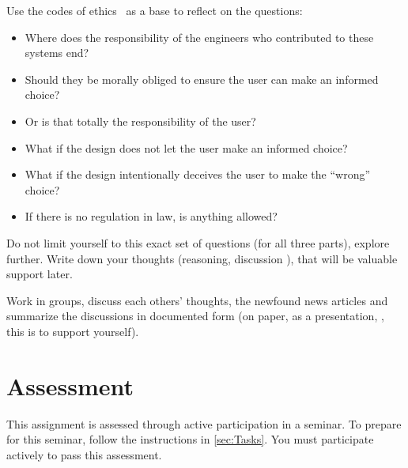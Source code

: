\begin{frame}
Use the codes of ethics~\cite{acmcode,acmsecode,ieeecode} as a base to reflect 
on the questions:
\begin{itemize}
  \item Where does the responsibility of the engineers who contributed to these 
    systems end?
  \item Should they be morally obliged to ensure the user can make an informed 
    choice?
  \item Or is that totally the responsibility of the user?
  \item What if the design does not let the user make an informed choice?
  \item What if the design intentionally deceives the user to make the 
    \enquote{wrong} choice?
  \item If there is no regulation in law, is anything allowed?
\end{itemize}
\end{frame}

Do not limit yourself to this exact set of questions (for all three parts), 
explore further.
Write down your thoughts (reasoning, discussion \etc), that will be valuable 
support later.

Work in groups, discuss each others' thoughts, the newfound news articles and 
summarize the discussions in documented form (on paper, as a presentation, 
\etc, this is to support yourself).


\section{Assessment}%
\label{Assessment}

This assignment is assessed through active participation in a seminar.
To prepare for this seminar, follow the instructions in \cref{sec:Tasks}.
You must participate actively to pass this assessment.

